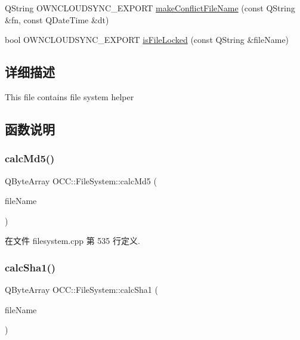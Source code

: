 \begin{DoxyCompactItemize}
\item 
Q\+String O\+W\+N\+C\+L\+O\+U\+D\+S\+Y\+N\+C\+\_\+\+E\+X\+P\+O\+RT \hyperlink{namespace_o_c_c_1_1_file_system_a256b42d497859d2117c151f6a88145fa}{make\+Conflict\+File\+Name} (const Q\+String \&fn, const Q\+Date\+Time \&dt)
\item 
bool O\+W\+N\+C\+L\+O\+U\+D\+S\+Y\+N\+C\+\_\+\+E\+X\+P\+O\+RT \hyperlink{namespace_o_c_c_1_1_file_system_add336ce16ac7bb1cf6ac6cb3c77b44ec}{is\+File\+Locked} (const Q\+String \&file\+Name)
\end{DoxyCompactItemize}


\subsection{详细描述}
This file contains file system helper 

\subsection{函数说明}
\mbox{\label{namespace_o_c_c_1_1_file_system_a055cc8e503b643fbc00a678461b6c61b}} 
\subsubsection{\texorpdfstring{calc\+Md5()}{calcMd5()}}
{\footnotesize\ttfamily Q\+Byte\+Array O\+C\+C\+::\+File\+System\+::calc\+Md5 (\begin{DoxyParamCaption}\item[{const Q\+String \&}]{file\+Name }\end{DoxyParamCaption})}



在文件 filesystem.\+cpp 第 535 行定义.

\mbox{\label{namespace_o_c_c_1_1_file_system_a375c2432148acc82cde481782216558d}} 
\subsubsection{\texorpdfstring{calc\+Sha1()}{calcSha1()}}
{\footnotesize\ttfamily Q\+Byte\+Array O\+C\+C\+::\+File\+System\+::calc\+Sha1 (\begin{DoxyParamCaption}\item[{const Q\+String \&}]{file\+Name }\end{DoxyParamCaption})}



